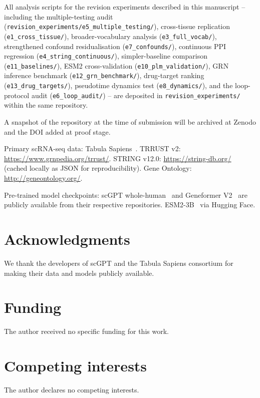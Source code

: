 \documentclass[12pt]{article}
\begin{document}
All analysis scripts for the revision experiments described in this manuscript -- including the multiple-testing audit (\texttt{revision\_experiments/e5\_multiple\_testing/}), cross-tissue replication (\texttt{e1\_cross\_tissue/}), broader-vocabulary analysis (\texttt{e3\_full\_vocab/}), strengthened confound residualisation (\texttt{e7\_confounds/}), continuous PPI regression (\texttt{e4\_string\_continuous/}), simpler-baseline comparison (\texttt{e11\_baselines/}), ESM2 cross-validation (\texttt{e10\_plm\_validation/}), GRN inference benchmark (\texttt{e12\_grn\_benchmark/}), drug-target ranking (\texttt{e13\_drug\_targets/}), pseudotime dynamics test (\texttt{e8\_dynamics/}), and the loop-protocol audit (\texttt{e6\_loop\_audit/}) -- are deposited in \texttt{revision\_experiments/} within the same repository.

A snapshot of the repository at the time of submission will be archived at Zenodo and the DOI added at proof stage.

Primary scRNA-seq data: Tabula Sapiens~\cite{jones2022tabula}.
TRRUST v2: \url{https://www.grnpedia.org/trrust/}.
STRING v12.0: \url{https://string-db.org/} (cached locally as JSON for reproducibility).
Gene Ontology: \url{http://geneontology.org/}.

Pre-trained model checkpoints: scGPT whole-human~\cite{cui2024scgpt} and Geneformer V2~\cite{theodoris2023transfer} are publicly available from their respective repositories. ESM2-3B~\cite{lin2023esm2} via Hugging Face.

\section*{Acknowledgments}
We thank the developers of scGPT and the Tabula Sapiens consortium for making their data and models publicly available.

\section*{Funding}
The author received no specific funding for this work.

\section*{Competing interests}
The author declares no competing interests.
\end{document}
